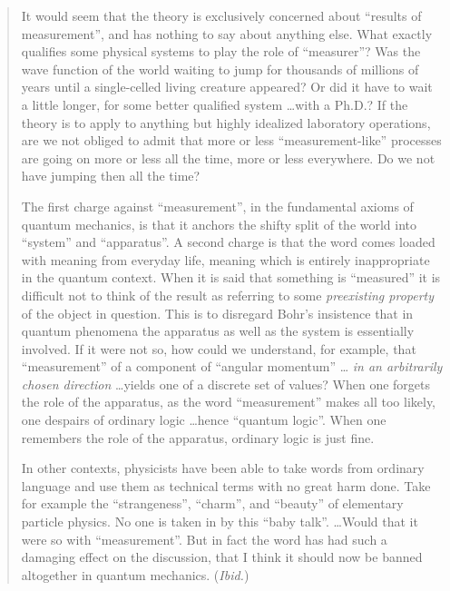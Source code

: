 \documentclass[12pt]{article}
\begin{document}
\begin{quotation}\setlength{\baselineskip}{12pt}\noindent
   It would seem that the theory is exclusively concerned about
   ``results of measurement'', and has nothing to say about anything
   else.  What exactly qualifies some physical systems to play the role
   of ``measurer''?  Was the wave function of the world waiting to jump
   for thousands of millions of years until a single-celled living
   creature appeared?  Or did it have to wait a little longer, for some
   better qualified system \dots with a Ph.D.?  If the theory is to
   apply to anything but highly idealized laboratory operations, are we
   not obliged to admit that more or less ``measurement-like''
   processes are going on more or less all the time, more or less
   everywhere.  Do we not have jumping then all the time?

   The first charge against ``measurement'', in the fundamental axioms
   of quantum mechanics, is that it anchors the shifty split of the
   world into ``system'' and ``apparatus''.  A second charge is that
   the word comes loaded with meaning {}from everyday life, meaning
   which is entirely inappropriate in the quantum context.  When it is
   said that something is ``measured'' it is difficult not to think of
   the result as referring to some {\it preexisting property\/} of the
   object in question.  This is to disregard Bohr's insistence that in
   quantum phenomena the apparatus as well as the system is essentially
   involved.  If it were not so, how could we understand, for example,
   that ``measurement'' of a component of ``angular momentum'' \dots
   {\it in an arbitrarily chosen direction\/} \dots yields one of a
   discrete set of values?  When one forgets the role of the apparatus,
   as the word ``measurement'' makes all too likely, one despairs of
   ordinary logic \dots hence ``quantum logic''.  When one remembers
   the role of the apparatus, ordinary logic is just fine.

   In other contexts, physicists have been able to take words {}from
   ordinary language and use them as technical terms with no great harm
   done.  Take for example the ``strangeness'', ``charm'', and
   ``beauty'' of elementary particle physics.  No one is taken in by
   this ``baby talk''. \dots Would that it were so with
   ``measurement''.  But in fact the word has had such a damaging
   effect on the discussion, that I think it should now be banned
   altogether in quantum mechanics.  ({\sl Ibid.\/})
\end{quotation}
\end{document}
